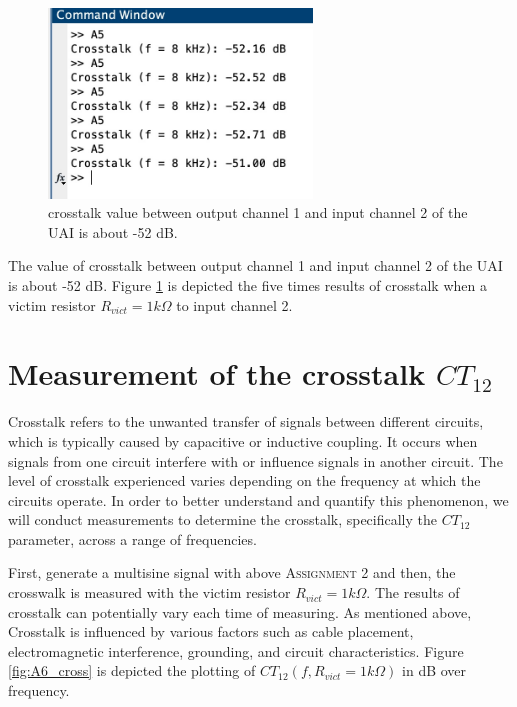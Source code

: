 \documentclass[
	a4paper,
	11pt,
]{article}
\begin{document}
\begin{figure}[htb!]
    \centerline{\includegraphics[width=7cm]{figure/A5/a5_crosstalk.jpg}}
    \caption{crosstalk value between output channel 1 and input channel 2 of the UAI is about -52 dB.}
    \label{fig:A5_crosstalk_value}
\end{figure}
The value of crosstalk between output channel 1 and input channel 2 of the UAI is about -52 dB. Figure \ref{fig:A5_crosstalk_value} is depicted the five times results of crosstalk when a victim resistor \(R_{vict} = 1k\Omega \) to input channel 2.

\section{Measurement of the crosstalk \(CT_{12}\)}
Crosstalk refers to the unwanted transfer of signals between different circuits, which is typically caused by capacitive or inductive coupling. It occurs when signals from one circuit interfere with or influence signals in another circuit. The level of crosstalk experienced varies depending on the frequency at which the circuits operate. In order to better understand and quantify this phenomenon, we will conduct measurements to determine the crosstalk, specifically the \(CT_{12}\) parameter, across a range of frequencies.

First, generate a multisine signal with above \textsc{Assignment 2} and then, the  crosswalk is measured with the victim resistor \(R_{vict} = 1 k \Omega\). The results of crosstalk can potentially vary each time of measuring. As mentioned above, Crosstalk is influenced by various factors such as cable placement, electromagnetic interference, grounding, and circuit characteristics. Figure \ref{fig:A6_cross} is depicted the plotting of \(CT_{12} (f, R_{vict} = 1 k\Omega)\) in dB over frequency.
\end{document}
